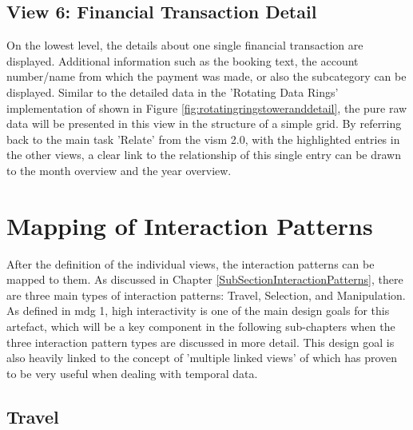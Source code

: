 
\subsection{View 6: Financial Transaction Detail}

On the lowest level, the details about one single financial transaction are displayed. Additional information such as the booking text, the account number/name from which the payment was made, or also the subcategory can be displayed. Similar to the detailed data in the 'Rotating Data Rings' implementation of \cite{CodeScience2015} shown in Figure \ref{fig:rotatingringstoweranddetail}, the pure raw data will be presented in this view in the structure of a simple grid. \newline
By referring back to the main task 'Relate' from the \gls{vism} 2.0, with the highlighted entries in the other views, a clear link to the relationship of this single entry can be drawn to the month overview and the year overview.



\section{Mapping of Interaction Patterns}

After the definition of the individual views, the interaction patterns can be mapped to them. As discussed in Chapter \ref{SubSectionInteractionPatterns}, there are three main types of interaction patterns: Travel, Selection, and Manipulation. As defined in \gls{mdg} 1, high interactivity is one of the main design goals for this artefact, which will be a key component in the following sub-chapters when the three interaction pattern types are discussed in more detail. This design goal is also heavily linked to the concept of 'multiple linked views' of \cite{Hentschel2009} which has proven to be very useful when dealing with temporal data.


\subsection{Travel}


